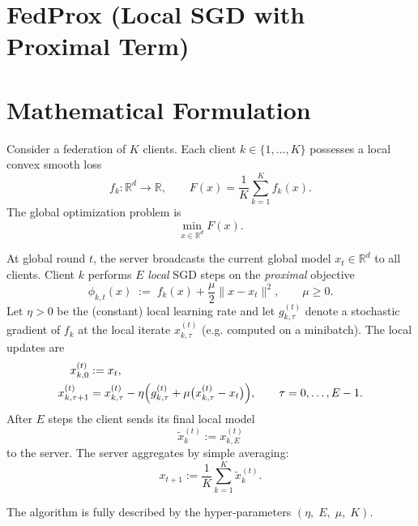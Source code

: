 \documentclass[11pt]{article}
\newcommand{\R}{\mathbb{R}}
\begin{document}
\section*{FedProx (Local SGD with Proximal Term)}

\section*{Mathematical Formulation}
Consider a federation of $K$ clients.  
Each client $k\in\{1,\dots,K\}$ possesses a local convex smooth loss
\[
f_k:\R^d\to\R,\qquad 
F(x)=\frac1K\sum_{k=1}^K f_k(x) .
\]
The global optimization problem is
\[
\min_{x\in\R^d} F(x). 
\]

At global round $t$, the server broadcasts the current global model $x_t\in\R^d$ to all clients.
Client $k$ performs $E$ \emph{local} SGD steps on the \emph{proximal} objective
\[
\phi_{k,t}(x)\;:=\;f_k(x)+\frac{\mu}{2}\|x-x_t\|^2,
\qquad \mu\ge 0.
\]
Let $\eta>0$ be the (constant) local learning rate and let
$g_{k,\tau}^{(t)}$ denote a stochastic gradient of $f_k$ at the local iterate
$x_{k,\tau}^{(t)}$ (e.g. computed on a minibatch).  
The local updates are
\begin{align}
x_{k,0}^{(t)} &:= x_t, \nonumber\\
x_{k,\tau+1}^{(t)} &= x_{k,\tau}^{(t)} - \eta\Bigl(g_{k,\tau}^{(t)}+\mu\bigl(x_{k,\tau}^{(t)}-x_t\bigr)\Bigr),
\qquad \tau=0,\dots,E-1. \label{eq:local-update}
\end{align}
After $E$ steps the client sends its final local model
\[
\tilde x_{k}^{(t)}:=x_{k,E}^{(t)}
\]
to the server.  
The server aggregates by simple averaging:
\[
x_{t+1}:=\frac1K\sum_{k=1}^K\tilde x_{k}^{(t)} . \tag{Server aggregation}
\]

The algorithm is fully described by the hyper‑parameters
$(\eta,\;E,\;\mu,\;K)$.
\end{document}
